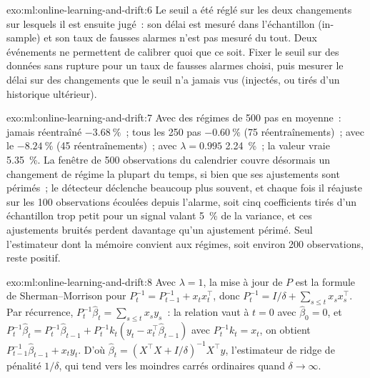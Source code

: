 \begin{solution}{exo:ml:online-learning-and-drift:6}
Le seuil a été réglé sur les deux changements sur lesquels il est ensuite jugé~: son délai est mesuré dans l'échantillon (in-sample) et son
taux de fausses alarmes n'est pas mesuré du tout. Deux événements ne permettent de calibrer quoi que ce soit. Fixer le seuil sur des données sans rupture pour un taux de fausses alarmes
choisi, puis mesurer le délai sur des changements que le seuil n'a jamais vus (injectés, ou tirés d'un historique ultérieur).
\end{solution}

\begin{solution}{exo:ml:online-learning-and-drift:7}
Avec des régimes de 500 pas en moyenne~: jamais réentraîné $-3.68~\%$~; tous les 250 pas $-0.60~\%$ (75 réentraînements)~; avec le  $-8.24~\%$ (45 réentraînements)~;  avec $\lambda = 0.995$ 2.24~\%~; la valeur vraie 5.35~\%. La fenêtre
de 500 observations du calendrier couvre désormais un changement de régime la plupart du temps, si bien que ses ajustements sont périmés~; le détecteur déclenche
beaucoup plus souvent, et chaque fois il réajuste sur les 100 observations écoulées depuis l'alarme, soit cinq coefficients tirés d'un échantillon trop petit pour un signal
valant 5~\% de la variance, et ces ajustements bruités perdent davantage qu'un ajustement périmé. Seul l'estimateur dont la mémoire convient aux
régimes, soit environ 200 observations, reste positif.
\end{solution}

\begin{solution}{exo:ml:online-learning-and-drift:8}
Avec $\lambda = 1$, la mise à jour de $P$ est la formule de Sherman--Morrison pour $P_t^{-1} = P_{t-1}^{-1} + x_tx_t^\top$, donc
$P_t^{-1} = I/\delta + \sum_{s\le t}x_sx_s^\top$. Par récurrence, $P_t^{-1}\hat\beta_t = \sum_{s\le t}x_sy_s$~: la relation vaut à
$t = 0$ avec $\hat\beta_0 = 0$, et $P_t^{-1}\hat\beta_t = P_t^{-1}\hat\beta_{t-1} + P_t^{-1}k_t(y_t - x_t^\top\hat\beta_{t-1})$
avec $P_t^{-1}k_t = x_t$, on obtient $P_{t-1}^{-1}\hat\beta_{t-1} + x_ty_t$. D'où $\hat\beta_t = (X^\top X + I/\delta)^{-1}X^\top y$,
l'estimateur de ridge de pénalité $1/\delta$, qui tend vers les moindres carrés ordinaires quand $\delta\to\infty$.
\end{solution}

